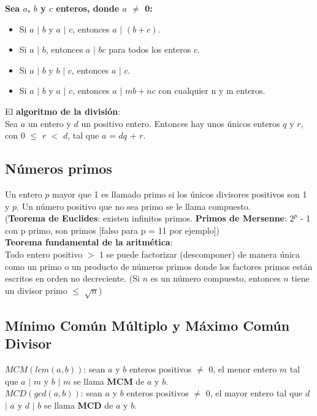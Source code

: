 \documentclass{article}
\begin{document}
\textbf{Sea $a$, $b$ y $c$ enteros, donde $a$ $\neq$ 0:}
\begin{itemize}
    \item Si $a$ $|$ $b$ y $a$ $|$ $c$, entonces $a$ $|$ $(b+c)$.
    \item Si $a$ $|$ $b$, entonces $a$ $|$ $bc$ para todos los enteros $c$.
    \item Si $a$ $|$ $b$ y $b$ $|$ $c$, entonces $a$ $|$ $c$.
    \item Si $a$ $|$ $b$ y $a$ $|$ $c$, entonces $a$ $|$ $mb + nc$ con cualquier n y m enteros.
\end{itemize}

El \textbf{algoritmo de la división}: \\
Sea $a$ un entero y $d$ un positivo entero. Entonces hay unos únicos enteros $q$ y $r$, con 0 $\leq$ $r$ $<$ $d$, tal que $a$ = $dq$ + $r$. 

\subsection{Números primos}
Un entero $p$ mayor que 1 es llamado primo si los únicos divisores positivos son 1 y $p$. Un número positivo que no sea primo se le llama compuesto. \\

(\textbf{Teorema de Euclides}: existen infinitos primos. \textbf{Primos de Mersenne}: $2^p$ - 1 con p primo, son primos [falso para p = 11 por ejemplo]) \\

\textbf{Teorema fundamental de la aritmética}: \\
Todo entero positivo $>$ 1 se puede factorizar (descomponer) de manera única como un primo o un producto de números primos donde los factores primos están escritos en orden no decreciente. (Si $n$ es un número compuesto, entonces $n$ tiene un divisor primo $\leq$ $\sqrt{n}$) \\

\newpage

\subsection{Mínimo Común Múltiplo y Máximo Común Divisor}
$MCM(lcm(a, b))$: sean $a$ y $b$ enteros positivos $\neq$ 0, el menor entero $m$ tal que $a$ $|$ $m$ y $b$ $|$ $m$ se llama \textbf{MCM} de $a$ y $b$. \\

$MCD(gcd(a, b))$: sean $a$ y $b$ enteros positivos $\neq$ 0, el mayor entero tal que $d$ $|$ $a$ y $d$ $|$ $b$ se llama \textbf{MCD} de $a$ y $b$. \\
\end{document}
